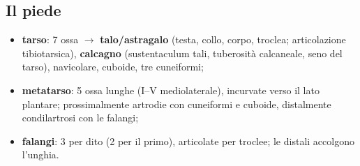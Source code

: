 \subsection{Il piede}
\begin{itemize}
  \item \textbf{tarso}: 7 ossa $\rightarrow$ \textbf{talo/astragalo} (testa, collo, corpo, troclea;
    articolazione tibiotarsica), \textbf{calcagno} (sustentaculum tali, tuberosità calcaneale, seno
    del tarso), navicolare, cuboide, tre cuneiformi;
  \item \textbf{metatarso}: 5 ossa lunghe (I--V mediolaterale), incurvate verso il lato plantare;
    prossimalmente artrodie con cuneiformi e cuboide, distalmente condilartrosi con le falangi;
  \item \textbf{falangi}: 3 per dito (2 per il primo), articolate per troclee; le distali accolgono
    l'unghia.
\end{itemize}
